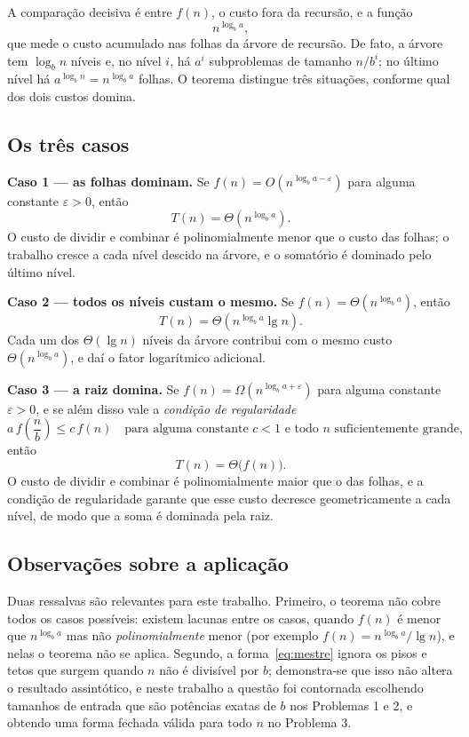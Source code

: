 \documentclass[11pt,a4paper]{article}
\begin{document}
A comparação decisiva é entre $f(n)$, o custo fora da recursão, e a função
\[
n^{\log_b a},
\]
que mede o custo acumulado nas folhas da árvore de recursão. De fato, a árvore tem $\log_b n$ níveis e, no nível $i$, há $a^i$ subproblemas de tamanho $n/b^i$; no último nível há $a^{\log_b n}=n^{\log_b a}$ folhas. O teorema distingue três situações, conforme qual dos dois custos domina.

\subsection{Os três casos}

\textbf{Caso 1 --- as folhas dominam.} Se $f(n)=O\!\left(n^{\log_b a-\varepsilon}\right)$ para alguma constante $\varepsilon>0$, então
\[
T(n)=\Theta\!\left(n^{\log_b a}\right).
\]
O custo de dividir e combinar é polinomialmente menor que o custo das folhas; o trabalho cresce a cada nível descido na árvore, e o somatório é dominado pelo último nível.

\textbf{Caso 2 --- todos os níveis custam o mesmo.} Se $f(n)=\Theta\!\left(n^{\log_b a}\right)$, então
\[
T(n)=\Theta\!\left(n^{\log_b a}\lg n\right).
\]
Cada um dos $\Theta(\lg n)$ níveis da árvore contribui com o mesmo custo $\Theta\!\left(n^{\log_b a}\right)$, e daí o fator logarítmico adicional.

\textbf{Caso 3 --- a raiz domina.} Se $f(n)=\Omega\!\left(n^{\log_b a+\varepsilon}\right)$ para alguma constante $\varepsilon>0$, e se além disso vale a \emph{condição de regularidade}
\begin{equation}
a\,f\!\left(\frac nb\right)\le c\,f(n)\quad\text{para alguma constante }c<1\text{ e todo }n\text{ suficientemente grande},
\label{eq:regularidade}
\end{equation}
então
\[
T(n)=\Theta\big(f(n)\big).
\]
O custo de dividir e combinar é polinomialmente maior que o das folhas, e a condição de regularidade garante que esse custo decresce geometricamente a cada nível, de modo que a soma é dominada pela raiz.

\subsection{Observações sobre a aplicação}

Duas ressalvas são relevantes para este trabalho. Primeiro, o teorema não cobre todos os casos possíveis: existem lacunas entre os casos, quando $f(n)$ é menor que $n^{\log_b a}$ mas não \emph{polinomialmente} menor (por exemplo $f(n)=n^{\log_b a}/\lg n$), e nelas o teorema não se aplica. Segundo, a forma~\eqref{eq:mestre} ignora os pisos e tetos que surgem quando $n$ não é divisível por $b$; demonstra-se que isso não altera o resultado assintótico, e neste trabalho a questão foi contornada escolhendo tamanhos de entrada que são potências exatas de $b$ nos Problemas 1 e 2, e obtendo uma forma fechada válida para todo $n$ no Problema 3.
\end{document}
